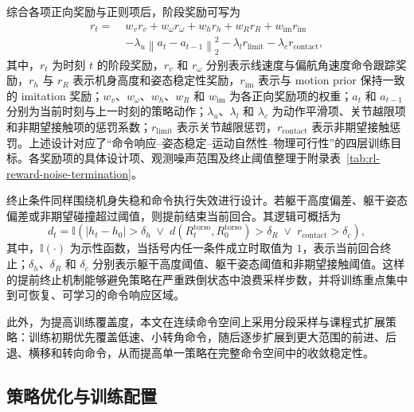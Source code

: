 综合各项正向奖励与正则项后，阶段奖励可写为
\begin{equation}
\begin{aligned}
r_t =\;& w_v r_v + w_{\omega} r_{\omega} + w_h r_h + w_R r_R + w_{\mathrm{im}} r_{\mathrm{im}} \\
&- \lambda_u \left\| a_t - a_{t-1} \right\|_2^2 - \lambda_l r_{\text{limit}} - \lambda_c r_{\text{contact}},
\end{aligned}
\end{equation}
其中，$r_t$ 为时刻 $t$ 的阶段奖励，$r_v$ 和 $r_{\omega}$ 分别表示线速度与偏航角速度命令跟踪奖励，$r_h$ 与 $r_R$ 表示机身高度和姿态稳定性奖励，$r_{\mathrm{im}}$ 表示与 motion prior 保持一致的 imitation 奖励；$w_v$、$w_{\omega}$、$w_h$、$w_R$ 和 $w_{\mathrm{im}}$ 为各正向奖励项的权重；$a_t$ 和 $a_{t-1}$ 分别为当前时刻与上一时刻的策略动作；$\lambda_u$、$\lambda_l$ 和 $\lambda_c$ 为动作平滑项、关节越限项和非期望接触项的惩罚系数；$r_{\text{limit}}$ 表示关节越限惩罚，$r_{\text{contact}}$ 表示非期望接触惩罚。上述设计对应了“命令响应--姿态稳定--运动自然性--物理可行性”的四层训练目标。各奖励项的具体设计项、观测噪声范围及终止阈值整理于附录表~\ref{tab:rl-reward-noise-termination}。

终止条件同样围绕机身失稳和命令执行失效进行设计。若躯干高度偏差、躯干姿态偏差或非期望碰撞超过阈值，则提前结束当前回合。其逻辑可概括为
\begin{equation}
d_t = \mathbb{I}\!\left(
\left| h_t - h_0 \right| > \delta_h
\;\vee\;
d\!\left(R_t^{\mathrm{torso}}, R_0^{\mathrm{torso}}\right) > \delta_R
\;\vee\;
r_{\text{contact}} > \delta_c
\right),
\end{equation}
其中，$\mathbb{I}(\cdot)$ 为示性函数，当括号内任一条件成立时取值为 $1$，表示当前回合终止；$\delta_h$、$\delta_R$ 和 $\delta_c$ 分别表示躯干高度阈值、躯干姿态阈值和非期望接触阈值。这样的提前终止机制能够避免策略在严重跌倒状态中浪费采样步数，并将训练重点集中到可恢复、可学习的命令响应区域。

此外，为提高训练覆盖度，本文在连续命令空间上采用分段采样与课程式扩展策略：训练初期优先覆盖低速、小转角命令，随后逐步扩展到更大范围的前进、后退、横移和转向命令，从而提高单一策略在完整命令空间中的收敛稳定性。


\subsection{策略优化与训练配置}

